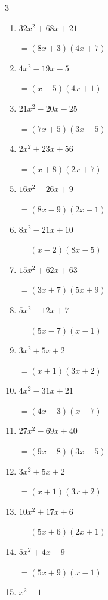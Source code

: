 \begin{multicols}{3}
\begin{enumerate}
  \itemsep=30pt
  \item $32x^{2}+68x+21$

        $=(8x+3)(4x+7)$

  \item $4x^{2}-19x-5$

        $=(x-5)(4x+1)$

  \item $21x^{2}-20x-25$

        $=(7x+5)(3x-5)$

  \item $2x^{2}+23x+56$

        $=(x+8)(2x+7)$

  \item $16x^{2}-26x+9$

        $=(8x-9)(2x-1)$

  \item $8x^{2}-21x+10$

        $=(x-2)(8x-5)$

  \item $15x^{2}+62x+63$

        $=(3x+7)(5x+9)$

  \item $5x^{2}-12x+7$

        $=(5x-7)(x-1)$

  \item $3x^{2}+5x+2$

        $=(x+1)(3x+2)$

  \item $4x^{2}-31x+21$

        $=(4x-3)(x-7)$

\columnbreak %

  \item $27x^{2}-69x+40$

        $=(9x-8)(3x-5)$

  \item $3x^{2}+5x+2$

        $=(x+1)(3x+2)$

  \item $10x^{2}+17x+6$

        $=(5x+6)(2x+1)$

  \item $5x^{2}+4x-9$

        $=(5x+9)(x-1)$

  \item $x^{2}-1$


\end{enumerate}
\end{multicols}
